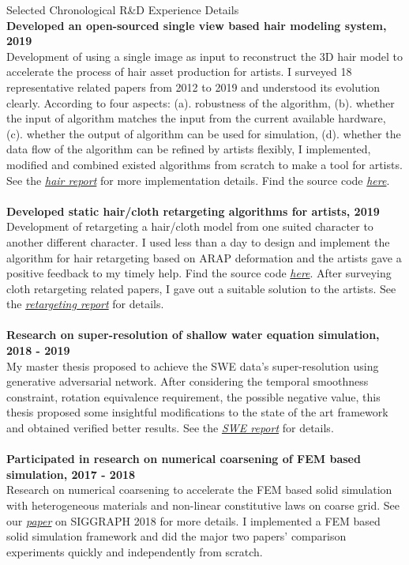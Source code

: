 \documentclass{resume} %
\begin{document}
\begin{rSection}{Selected Chronological R\&D Experience Details}
  \\{\bf Developed an open-sourced single view based hair modeling system, 2019}\\ Development of using a single image as input to reconstruct the 3D hair model to accelerate the process of hair asset production for artists. I surveyed 18 representative related papers from 2012 to 2019 and understood its evolution clearly. According to four aspects: (a). robustness of the algorithm, (b). whether the input of algorithm matches the input from the current available hardware, (c). whether the output of algorithm can be used for simulation, (d). whether the data flow of the algorithm can be refined by artists flexibly, I implemented, modified and combined existed algorithms from scratch to make a tool for artists. See the \emph{\href{https://wtyatzoo.github.io/reports/hair.pdf}{hair report}} for more implementation details. Find the source code \emph{\href{https://github.com/WTYatzoo/hair\_modeling}{here}}.\\
  \\{\bf Developed static hair/cloth retargeting algorithms for artists, 2019}\\ Development of retargeting a hair/cloth model from one suited character to another different character. I used less than a day to design and implement the algorithm for hair retargeting based on ARAP deformation and the artists gave a positive feedback to my timely help. Find the source code \emph{\href{https://github.com/WTYatzoo/hair\_retargeting}{here}}. After surveying cloth retargeting related papers, I gave out a suitable solution to the artists. See the \emph{\href{https://wtyatzoo.github.io/reports/retargeting.pdf}{retargeting report}} for details.\\
  \\{\bf Research on super-resolution of shallow water equation simulation, 2018 - 2019}\\ My master thesis proposed to achieve the SWE data's super-resolution using generative adversarial network. After considering the temporal smoothness constraint, rotation equivalence requirement, the possible negative value, this thesis proposed some insightful modifications to the state of the art framework and obtained verified better results. See the \emph{\href{https://wtyatzoo.github.io/reports/SWE.pdf}{SWE report}} for details. \\
  \\{\bf Participated in research on numerical coarsening of FEM based simulation, 2017 - 2018}\\ Research on numerical coarsening to accelerate the FEM based solid simulation with heterogeneous materials and non-linear constitutive laws on coarse grid. See our \emph{\href{https://wtyatzoo.github.io/peer\_reviewed/opt\_basis\_18.pdf}{paper}} on SIGGRAPH 2018 for more details. I implemented a FEM based solid simulation framework and did the major two papers' comparison experiments quickly and independently from scratch.\\
\end{rSection}
\end{document}
